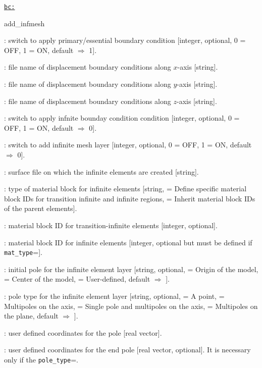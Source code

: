 \texttt{\underline{bc:}}
\begin{adescription}{add\_infmesh}
  \item[ubc]  : switch to apply primary/essential boundary condition [integer, optional, 0 = OFF, 1 = ON, default $\Rightarrow$ 1].
  \item[uxfile]: file name of displacement boundary conditions along $x$-axis [string].
  \item[uyfile]: file name of displacement boundary conditions along $y$-axis [string].
  \item[uzfile]: file name of displacement boundary conditions along $z$-axis [string].
  \item[infbc]  : switch to apply infnite bounday condition condition [integer, optional, 0 = OFF, 1 = ON, default $\Rightarrow$ 0].
  \item[add\_infmesh]  : switch to add infinite mesh layer [integer, optional, 0 = OFF, 1 = ON, default $\Rightarrow$ 0].
  \item[infrfile]  : surface file on which the infinite elements are created [string].
  \item[mat\_type]  : type of material block for infinite elements [string, \texttt{} = Define specific material block IDs for transition infinite and infinite regions, \texttt{} = Inherit material block IDs of the parent elements].
  \item[imat\_trinf]  : material block ID for transition-infinite elements [integer, optional].
  \item[imat\_inf]  : material block ID for infinite elements [integer, optional but must be defined if \texttt{mat\_type}=\texttt{}].
  \item[pole0]  : initial pole for the infinite element layer [string, optional, \texttt{} = Origin of the model, \texttt{} = Center of the model, \texttt{} = User-defined, default $\Rightarrow$ \texttt{}].
  \item[pole\_type]  : pole type for the infinite element layer [string, optional, \texttt{} = A point, \texttt{} = Multipoles on the axis, \texttt{} = Single pole and multipoles on the axis, \texttt{} = Multipoles on the plane, default $\Rightarrow$ \texttt{}].
  \item[coord0]: user defined coordinates for the pole [real vector].
  \item[coord1]: user defined coordinates for the end pole [real vector, optional]. It is necessary only if the \texttt{pole\_type}=\texttt{}.

\end{adescription}
